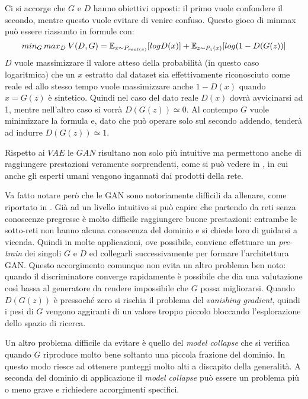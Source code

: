 Ci si accorge che $G$ e $D$ hanno obiettivi opposti: il primo vuole confondere il secondo, mentre questo vuole evitare di venire confuso.
Questo gioco di minmax può essere riassunto in  formule con:
$$
min_G \, max_D \: V(D,G) = \mathbb{E}_{x \sim P_{real(x)}} [ log D(x) ] 
+
\mathbb{E}_{z \sim P_z(x)} [ log ( 1 - D(G(z)) ]
$$
$D$ vuole massimizzare il valore atteso della probabilità (in questo caso logaritmica) che un $x$ estratto dal dataset sia effettivamente riconosciuto come reale ed allo stesso tempo vuole massimizzare anche $ 1 - D(x)$ quando $x=G(z)$ è sintetico.
Quindi nel caso del dato reale $D(x)$ dovrà avvicinarsi ad 1, mentre nell'altro caso si vorrà $D(G(z)) \simeq 0$.
Al contempo $G$ vuole minimizzare la formula e, dato che può operare solo sul secondo addendo, tenderà ad indurre $D(G(z)) \simeq 1$.

Rispetto ai $VAE$ le $GAN$ risultano non solo più intuitive ma permettono anche di raggiungere prestazioni veramente sorprendenti, come si può vedere in \cite{GAN_HD}, in cui anche gli esperti umani vengono ingannati dai prodotti della rete.

Va fatto notare però che le GAN sono notoriamente difficili da allenare, come riportato in \cite{HARD_GAN}.
Già ad un livello intuitivo si può capire che partendo da reti senza conoscenze pregresse è molto difficile raggiungere buone prestazioni: entrambe le sotto-reti non hanno alcuna conoscenza del dominio e si chiede loro di guidarsi a vicenda.
Quindi in molte applicazioni, ove possibile, conviene effettuare un \emph{pre-train} dei singoli $G$ e $D$ ed collegarli successivamente per formare l'architettura GAN.
Questo accorgimento comunque non evita un altro problema ben noto: quando il discriminatore converge rapidamente è possibile che dia una valutazione così bassa al generatore da rendere impossibile che $G$ possa migliorarsi.
Quando $D(G(z))$ è pressoché zero si rischia il problema del \emph{vanishing gradient}, quindi i pesi di $G$ vengono aggiranti di un valore troppo piccolo bloccando l'esplorazione dello spazio di ricerca.

Un altro problema difficile da evitare è quello del \emph{model collapse} che si verifica quando $G$ riproduce molto bene soltanto una piccola frazione del dominio.
In questo modo riesce ad ottenere punteggi molto alti a discapito della generalità.
A seconda del dominio di applicazione il \emph{model collapse} può essere un problema più o meno grave e richiedere accorgimenti specifici.






